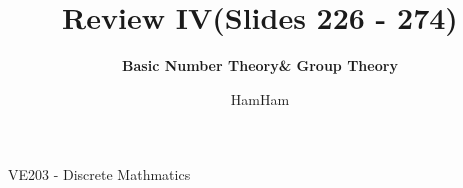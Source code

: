 \documentclass{beamer}
\title{\sffamily Review IV(Slides 226 - 274)}
\subtitle{\textbf{Basic Number Theory\& Group Theory}\\}
\institute[UM-SJTU JI]{University of Michigan-Shanghai Jiao Tong University Joint Institute}
\author{HamHam}
\newcommand{\myfont}{\rmfamily\normalsize\upshape\mdseries}
\begin{document}
\begin{titlepage}
    \begin{center}
        VE203 - Discrete Mathmatics 
    \end{center}
\end{titlepage}
\myfont
\end{document}

